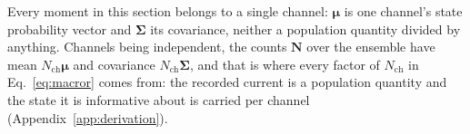 Every moment in this section belongs to a single channel: $\bm{\mu}$ is one channel's state
probability vector and $\bm{\Sigma}$ its covariance, neither a population quantity divided by
anything. Channels being independent, the counts $\mathbf{N}$ over the ensemble have mean
$N_{\mathrm{ch}}\bm{\mu}$ and covariance $N_{\mathrm{ch}}\bm{\Sigma}$, and that is where every
factor of $N_{\mathrm{ch}}$ in Eq.~\ref{eq:macror} comes from: the recorded current is a
population quantity and the state it is informative about is carried per channel
(Appendix~\ref{app:derivation}).

